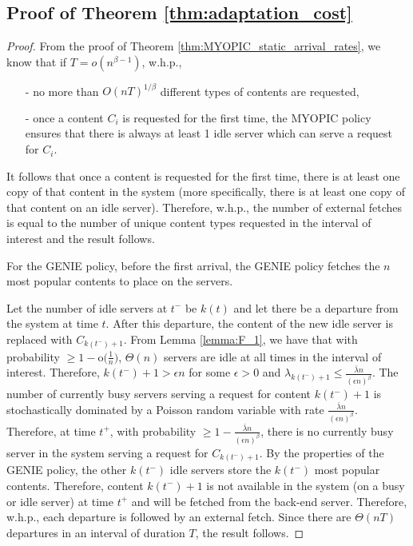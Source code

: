 \documentclass[10pt, conference, letterpaper]{IEEEtran}
\def \oo {\mathrm{o}}
\begin{document}
\subsection{Proof of Theorem \ref{thm:adaptation_cost}}
\begin{proof}
	From the proof of Theorem \ref{thm:MYOPIC_static_arrival_rates}, we know that if $T = o(n^{\beta-1})$, w.h.p.,
	\begin{itemize}
		\item[-] no more than $O(nT)^{1/\beta}$ different types of contents are requested,
		\item[-] once a content $C_i$ is requested for the first time, the MYOPIC policy ensures that there is always at least 1 idle server which can serve a request for $C_i$.
	\end{itemize}
	
	It follows that once a content is requested for the first time, there is at least one copy of that content in the system (more specifically, there is at least one copy of that content on an idle server). Therefore, w.h.p., the number of external fetches is equal to the number of unique content types requested in the interval of interest and the result follows.
	
	For the GENIE policy, before the first arrival, the GENIE policy fetches the $n$ most popular contents to place on the servers.
	
	Let the number of idle servers at $t^-$ be $k(t)$ and let there be a departure from the system at time $t$. After this departure, the content of the new idle server is replaced with $C_{k(t^-)+1}$. From Lemma \ref{lemma:F_1}, we have that with probability $\geq 1 -\oo\big(\frac{1}{n}\big)$, $\Theta(n)$ servers are idle at all times in the interval of interest. Therefore, $k(t^-)+1 > \epsilon n$ for some $\epsilon > 0$ and $\lambda_{k(t^-)+1} \leq \frac{\bar{\lambda} n}{(\epsilon n)^{\beta}}$. The number of currently busy servers serving a request for content $k(t^-)+1$ is stochastically dominated by a Poisson random variable with rate $\frac{\bar{\lambda} n}{(\epsilon n)^{\beta}}$. Therefore, at time $t^+$, with probability $\geq 1 - \frac{\bar{\lambda} n}{(\epsilon n)^{\beta}}$, there is no currently busy server in the system serving a request for $C_{k(t^-)+1}$. By the properties of the GENIE policy, the other $k(t^-)$ idle servers store the $k(t^-)$ most popular contents. Therefore, content $k(t^-)+1$ is not available in the system (on a busy or idle server) at time $t^+$ and will be fetched from the back-end server. Therefore, w.h.p., each departure is followed by an external fetch. Since there are $\Theta(nT)$ departures in an interval of duration $T$, the result follows.
	
\end{proof}
\end{document}
